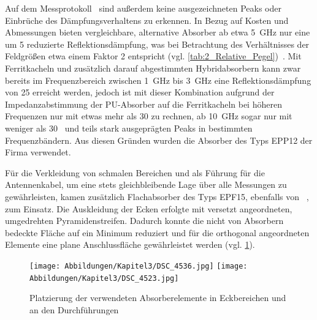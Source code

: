 Auf dem Messprotokoll~\cite{Eco_Messtechnik_Absorber} sind außerdem keine ausgezeichneten Peaks oder Einbrüche des Dämpfungsverhaltens zu erkennen. In Bezug auf Kosten und Abmessungen bieten vergleichbare, alternative Absorber ab etwa \SI{5}{\giga\hertz} nur eine um \SI{5}{\Dezibel} reduzierte Reflektionsdämpfung, was bei Betrachtung des Verhältnisses der Feldgrößen etwa einem Faktor 2 entspricht (vgl. \Tabelle\ref{tab:2_Relative_Pegel})~\cite{Holland_Shielding_Absorber}. Mit Ferritkacheln und zusätzlich darauf abgestimmten Hybridabsorbern kann zwar bereits im Frequenzbereich zwischen \SI{1}{\giga\hertz} bis \SI{3}{\giga\hertz} eine Reflektionsdämpfung von \SI{25}{\Dezibel} erreicht werden, jedoch ist mit dieser Kombination aufgrund der Impedanzabstimmung der PU-Absorber auf die Ferritkacheln bei höheren Frequenzen nur mit etwas mehr als \SI{30}{\Dezibel} zu rechnen, ab \SI{10}{\giga\hertz} sogar nur mit weniger als \SI{30}{\Dezibel}~\cite{Holland_Shielding_Absorber} und teils stark ausgeprägten Peaks in bestimmten Frequenzbändern. Aus diesen Gründen wurden die Absorber des Typs EPP12 der Firma  verwendet. 
\par
\vspace{\linespace}
Für die Verkleidung von schmalen Bereichen und als Führung für die Antennenkabel, um eine stets gleichbleibende Lage über alle Messungen zu gewährleisten, kamen zusätzlich Flachabsorber des Typs EPF15, ebenfalls von ~\cite{Eco_Messtechnik_Absorber}, zum Einsatz. Die Auskleidung der Ecken erfolgte mit versetzt angeordneten, umgedrehten Pyramidenstreifen. Dadurch konnte die nicht von Absorbern bedeckte Fläche auf ein Minimum reduziert und für die orthogonal angeordneten Elemente eine plane Anschlussfläche gewährleistet werden (vgl. \Abb\ref{fig:3_Absorberplatzierung}).
\par
\vspace{\linespace}

\begin{figure}[ht]
    \centering
    \texttt{[image: Abbildungen/Kapitel3/DSC\_4536.jpg]}
    \hspace{1cm}
    \texttt{[image: Abbildungen/Kapitel3/DSC\_4523.jpg]}
    \caption[Platzierung der verwendeten Absorber in Eckbereichen und an Durchführungen]{Platzierung der verwendeten Absorberelemente in Eckbereichen und an den Durchführungen}
    \label{fig:3_Absorberplatzierung}
\end{figure}


